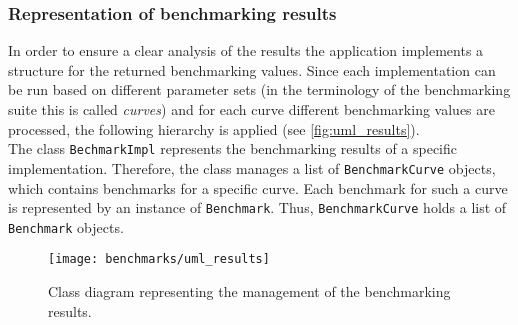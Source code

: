 \subsubsection{Representation of benchmarking results}
In order to ensure a clear analysis of the results the application implements a structure for the returned benchmarking values. Since each implementation can be run based on different parameter sets (in the terminology of the benchmarking suite this is called \textit{curves}) and for each curve different benchmarking values are processed, the following hierarchy is applied (see \autoref{fig:uml_results}).\\
The class \texttt{BechmarkImpl} represents the benchmarking results of a specific implementation. Therefore, the class manages a list of \texttt{BenchmarkCurve} objects, which contains benchmarks for a specific curve. Each benchmark for such a curve is represented by an instance of \texttt{Benchmark}. Thus, \texttt{BenchmarkCurve} holds a list of \texttt{Benchmark} objects.
\begin{figure}[H]
  \centering
  \texttt{[image: benchmarks/uml\_results]}
  \caption[Class diagram for benchmarking results.]
  {Class diagram representing the management of the benchmarking results.}\label{fig:uml_results}
\end{figure}

